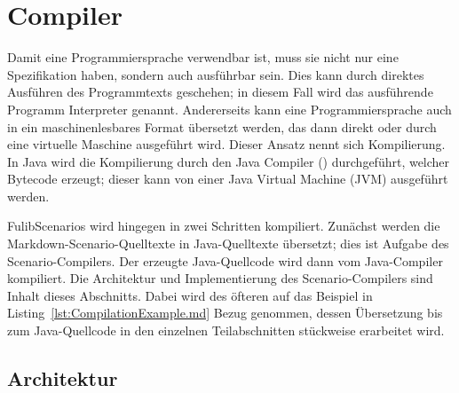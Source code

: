 \section{Compiler}\label{sec:compiler}

Damit eine Programmiersprache verwendbar ist, muss sie nicht nur eine Spezifikation haben, sondern auch ausführbar sein.
Dies kann durch direktes Ausführen des Programmtexts geschehen;
in diesem Fall wird das ausführende Programm Interpreter genannt.
Andererseits kann eine Programmiersprache auch in ein maschinenlesbares Format übersetzt werden,
das dann direkt oder durch eine virtuelle Maschine ausgeführt wird.
Dieser Ansatz nennt sich Kompilierung.
In Java wird die Kompilierung durch den Java Compiler () durchgeführt, welcher Bytecode erzeugt;
dieser kann von einer Java Virtual Machine (JVM) ausgeführt werden.

FulibScenarios wird hingegen in zwei Schritten kompiliert.
Zunächst werden die Markdown-Scenario-Quelltexte in Java-Quelltexte übersetzt;
dies ist Aufgabe des Scenario-Compilers.
Der erzeugte Java-Quellcode wird dann vom Java-Compiler kompiliert.
Die Architektur und Implementierung des Scenario-Compilers sind Inhalt dieses Abschnitts.
Dabei wird des öfteren auf das Beispiel in Listing~\ref{lst:CompilationExample.md} Bezug genommen,
dessen Übersetzung bis zum Java-Quellcode in den einzelnen Teilabschnitten stückweise erarbeitet wird.



\subsection{Architektur}\label{subsec:compiler-architecture}


